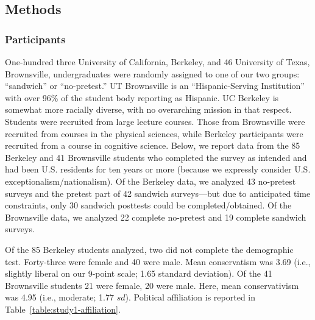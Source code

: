 
\subsection{Methods}

\subsubsection{Participants}

One-hundred three University of California, Berkeley, and 46 University of
Texas, Brownsville, undergraduates were randomly assigned to one of our two
groups: “sandwich” or “no-pretest.” UT Brownsville is an “Hispanic-Serving
Institution” with over 96\% of the student body reporting as Hispanic. UC
Berkeley is somewhat more racially diverse, with no overarching mission in that
respect. Students were recruited from large lecture courses. Those from
Brownsville were recruited from courses in the physical sciences, while Berkeley
participants were recruited from a course in cognitive science.  Below, we
report data from the 85 Berkeley and 41 Brownsville students who completed the
survey as intended and had been U.S. residents for ten years or more (because we
expressly consider U.S. exceptionalism/nationalism). Of the Berkeley data, we
analyzed 43 no-pretest surveys and the pretest part of 42 sandwich surveys---but
due to anticipated time constraints, only 30 sandwich posttests could be
completed/obtained. Of the Brownsville data, we analyzed 22 complete no-pretest
and 19 complete sandwich surveys.

Of the 85 Berkeley students analyzed, two did not complete the demographic test.
Forty-three were female and 40 were male. Mean conservatism was 3.69 (i.e., slightly
liberal on our 9-point scale; 1.65 standard deviation). Of the 41 Brownsville
students 21 were female, 20 were male. Here, mean conservativism was 4.95 (i.e.,
moderate; 1.77 $sd$). Political affiliation is reported in
Table~\ref{table:study1-affiliation}.

